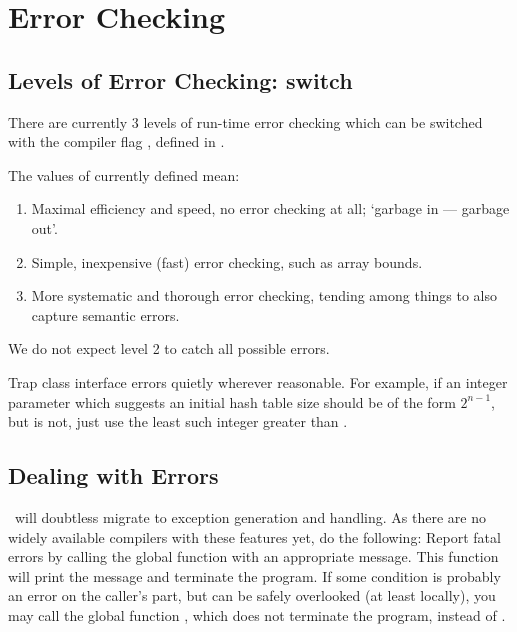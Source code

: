 \section{Error Checking}

\subsection{Levels of Error Checking:  switch}

There are currently 3 levels of run-time error checking which can be
switched with the compiler flag , defined in
.

The values of  currently defined mean:

\begin{enumerate}
\setcounter{enumi}{0}

\item
Maximal efficiency and speed, no error checking at all;
`garbage in --- garbage out'.

\item
Simple, inexpensive (fast) error checking, such as array bounds.

\item
More systematic and thorough error checking, tending among things to also
capture semantic errors.

\end{enumerate}

We do not expect level 2 to catch all possible errors.

Trap class interface errors quietly wherever reasonable. For example,
if an integer parameter  which suggests an initial hash table
size should be of the form $2^{n-1}$, but is not, just use the least such
integer greater than .

\subsection{Dealing with Errors}


\magnus\ will doubtless migrate to exception generation and
handling. As there are no widely available compilers with these
features yet, do the following: Report fatal errors by calling the
global function  with an appropriate message. This
function will print the message and terminate the program.
If some condition is probably an error on the caller's part,
but can be safely overlooked (at least locally), you may call the global
function , which does not terminate the program,
instead of .

